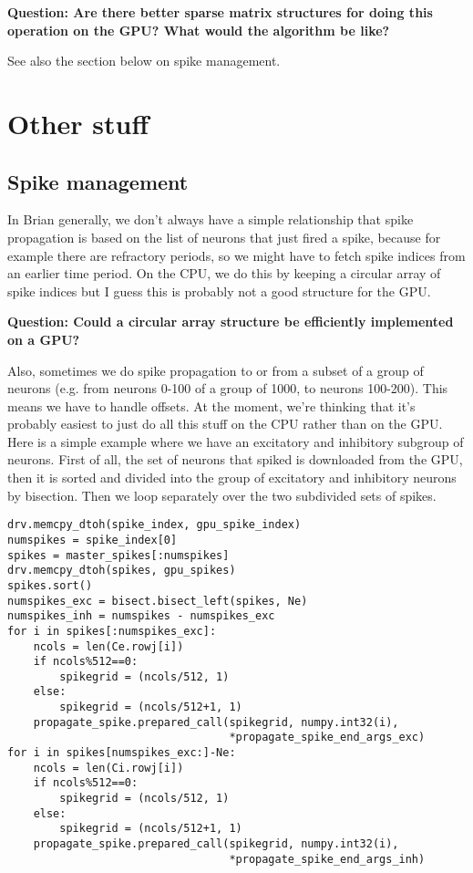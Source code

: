 \documentclass[a4paper]{article}
\newcommand{\question}[1]{\textbf{Question: #1}}
\begin{document}
\question{Are there better sparse matrix structures for doing this operation on the GPU? What would the algorithm be like?}

See also the section below on spike management.

\section{Other stuff}

\subsection{Spike management}

In Brian generally, we don't always have a simple relationship that spike propagation is based on the list of neurons that just fired a spike, because for example there are refractory periods, so we might have to fetch spike indices from an earlier time period. On the CPU, we do this by keeping a circular array of spike indices but I guess this is probably not a good structure for the GPU.

\question{Could a circular array structure be efficiently implemented on a GPU?}

Also, sometimes we do spike propagation to or from a subset of a group of neurons (e.g. from neurons 0-100 of a group of 1000, to neurons 100-200). This means we have to handle offsets. At the moment, we're thinking that it's probably easiest to just do all this stuff on the CPU rather than on the GPU. Here is a simple example where we have an excitatory and inhibitory subgroup of neurons. First of all, the set of neurons that spiked is downloaded from the GPU, then it is sorted and divided into the group of excitatory and inhibitory neurons by bisection. Then we loop separately over the two subdivided sets of spikes.

\begin{lstlisting}
drv.memcpy_dtoh(spike_index, gpu_spike_index)
numspikes = spike_index[0]
spikes = master_spikes[:numspikes]
drv.memcpy_dtoh(spikes, gpu_spikes)
spikes.sort()
numspikes_exc = bisect.bisect_left(spikes, Ne)
numspikes_inh = numspikes - numspikes_exc
for i in spikes[:numspikes_exc]:
    ncols = len(Ce.rowj[i])
    if ncols%512==0:
        spikegrid = (ncols/512, 1)
    else:
        spikegrid = (ncols/512+1, 1)
    propagate_spike.prepared_call(spikegrid, numpy.int32(i),
                                  *propagate_spike_end_args_exc)
for i in spikes[numspikes_exc:]-Ne:
    ncols = len(Ci.rowj[i])
    if ncols%512==0:
        spikegrid = (ncols/512, 1)
    else:
        spikegrid = (ncols/512+1, 1)
    propagate_spike.prepared_call(spikegrid, numpy.int32(i),
                                  *propagate_spike_end_args_inh)
\end{lstlisting}
\end{document}
